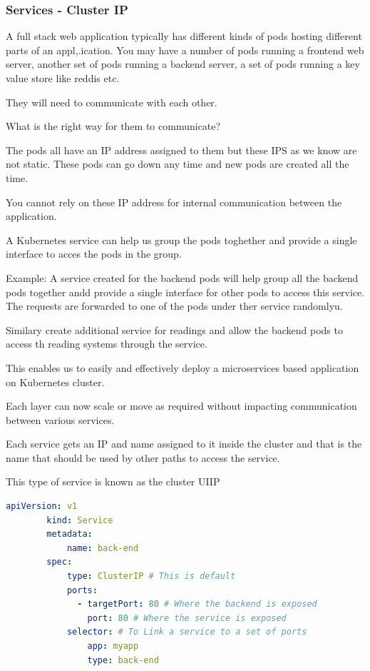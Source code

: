 \documentclass[11pt]{book}
\begin{document}
    \subsubsection{Services - Cluster IP}

    A full stack web application typically has different kinds of pods hosting different parts of an appl,.ication.
    You may have a number of pods running a frontend web server, another set of pods running a backend server, a set of pods running a key value store like reddis etc.

    They will need to communicate with each other.

    What is the right way for them to communicate?

    The pods all have an IP address assigned to them but these IPS as we know are not static.
    These pods can go down any time and new pods are created all the time.

    You cannot rely on these IP address for internal communication between the application.

    A Kubernetes service can help us group the pods toghether and provide a single interface to acces the pods in the group.

    Example:
    A service created for the backend pods will help group all the backend pods together andd provide a single interface for other pods to access this service.
    The requests are forwarded to one of the pods under ther service randomlyu.

    Similary create additional service for readings and allow the backend pods to access th reading systems through the service.

    This enables us to easily and effectively deploy a microservices based application on Kubernetes cluster.

    Each layer can now scale or move as required without impacting communication between various services.

    Each service gets an IP and name assigned to it inside the cluster and that is the name that should be used by other paths to access the service.

    This type of service is known as the cluster UIIP

    \begin{lstlisting}[language=yaml, caption={Cluster IP service definition}]
        apiVersion: v1
        kind: Service
        metadata:
            name: back-end
        spec:
            type: ClusterIP # This is default
            ports:
              - targetPort: 80 # Where the backend is exposed
                port: 80 # Where the service is exposed
            selector: # To Link a service to a set of ports
                app: myapp
                type: back-end
    \end{lstlisting}
\end{document}
